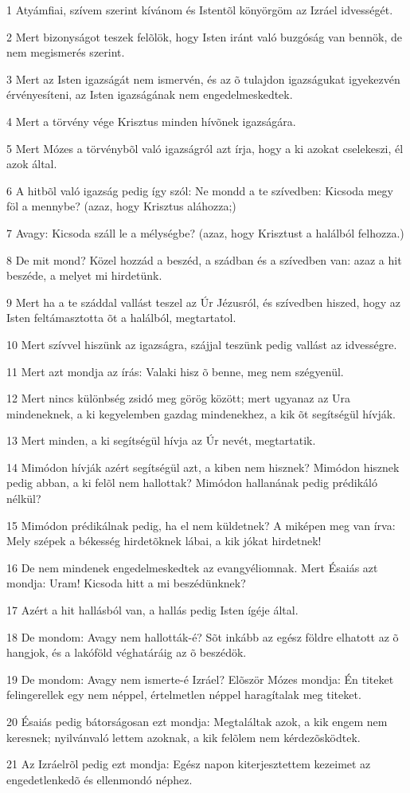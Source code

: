 \par 1 Atyámfiai, szívem szerint kívánom és Istentõl könyörgöm az Izráel idvességét.
\par 2 Mert bizonyságot teszek felõlök, hogy Isten iránt való buzgóság van bennök, de  nem megismerés szerint.
\par 3 Mert az Isten igazságát nem ismervén, és az õ tulajdon igazságukat igyekezvén érvényesíteni, az Isten igazságának nem engedelmeskedtek.
\par 4 Mert a törvény vége Krisztus minden hívõnek igazságára.
\par 5 Mert Mózes a törvénybõl való igazságról azt írja, hogy a ki azokat cselekeszi, él azok által.
\par 6 A hitbõl való igazság pedig így szól: Ne mondd a te szívedben: Kicsoda megy föl a mennybe? (azaz, hogy Krisztus aláhozza;)
\par 7 Avagy: Kicsoda száll le a mélységbe? (azaz, hogy Krisztust a halálból felhozza.)
\par 8 De mit mond? Közel hozzád a beszéd, a szádban és a szívedben van: azaz a hit beszéde, a melyet mi hirdetünk.
\par 9 Mert ha a te száddal vallást teszel az Úr Jézusról, és szívedben hiszed, hogy az Isten feltámasztotta õt a halálból, megtartatol.
\par 10 Mert szívvel hiszünk az igazságra, szájjal teszünk pedig vallást az idvességre.
\par 11 Mert azt mondja az írás: Valaki hisz õ benne, meg nem szégyenül.
\par 12 Mert nincs különbség zsidó meg görög között; mert ugyanaz az Ura mindeneknek, a ki kegyelemben gazdag mindenekhez, a kik õt segítségül hívják.
\par 13 Mert minden, a ki segítségül hívja az Úr nevét, megtartatik.
\par 14 Mimódon hívják azért segítségül azt, a kiben nem hisznek? Mimódon hisznek pedig abban, a ki felõl nem hallottak? Mimódon hallanának pedig prédikáló nélkül?
\par 15 Mimódon prédikálnak pedig, ha el nem küldetnek? A miképen meg van írva: Mely szépek a békesség hirdetõknek lábai, a kik jókat hirdetnek!
\par 16 De nem mindenek engedelmeskedtek az evangyéliomnak. Mert Ésaiás azt mondja: Uram! Kicsoda hitt a mi beszédünknek?
\par 17 Azért a hit hallásból van, a hallás pedig Isten ígéje által.
\par 18 De mondom: Avagy nem hallották-é? Sõt inkább az egész földre elhatott az õ hangjok, és a lakóföld véghatáráig az õ beszédök.
\par 19 De mondom: Avagy nem ismerte-é Izráel? Elõször Mózes mondja: Én titeket felingerellek egy nem néppel, értelmetlen néppel haragítalak meg titeket.
\par 20 Ésaiás pedig bátorságosan ezt mondja: Megtaláltak azok, a kik engem nem keresnek; nyilvánvaló lettem azoknak, a kik felõlem nem kérdezõsködtek.
\par 21 Az Izráelrõl pedig ezt mondja: Egész napon kiterjesztettem kezeimet az engedetlenkedõ és ellenmondó néphez.

